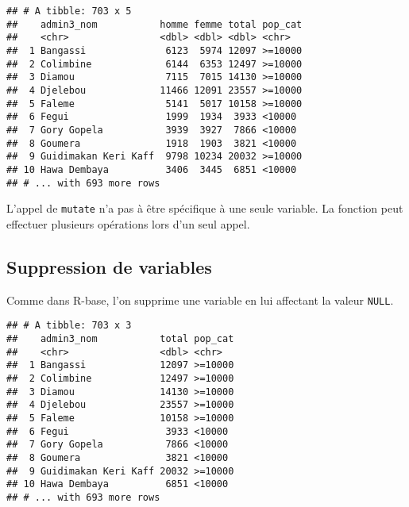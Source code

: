 \documentclass[]{book}
\newenvironment{Shaded}{\begin{snugshade}}{\end{snugshade}}
\newcommand{\KeywordTok}[1]{\textcolor[rgb]{0.13,0.29,0.53}{\textbf{#1}}}
\newcommand{\DataTypeTok}[1]{\textcolor[rgb]{0.13,0.29,0.53}{#1}}
\newcommand{\DecValTok}[1]{\textcolor[rgb]{0.00,0.00,0.81}{#1}}
\newcommand{\StringTok}[1]{\textcolor[rgb]{0.31,0.60,0.02}{#1}}
\newcommand{\CommentTok}[1]{\textcolor[rgb]{0.56,0.35,0.01}{\textit{#1}}}
\newcommand{\OtherTok}[1]{\textcolor[rgb]{0.56,0.35,0.01}{#1}}
\newcommand{\OperatorTok}[1]{\textcolor[rgb]{0.81,0.36,0.00}{\textbf{#1}}}
\newcommand{\NormalTok}[1]{#1}
\begin{document}
\begin{verbatim}
## # A tibble: 703 x 5
##    admin3_nom           homme femme total pop_cat
##    <chr>                <dbl> <dbl> <dbl> <chr>  
##  1 Bangassi              6123  5974 12097 >=10000
##  2 Colimbine             6144  6353 12497 >=10000
##  3 Diamou                7115  7015 14130 >=10000
##  4 Djelebou             11466 12091 23557 >=10000
##  5 Faleme                5141  5017 10158 >=10000
##  6 Fegui                 1999  1934  3933 <10000 
##  7 Gory Gopela           3939  3927  7866 <10000 
##  8 Goumera               1918  1903  3821 <10000 
##  9 Guidimakan Keri Kaff  9798 10234 20032 >=10000
## 10 Hawa Dembaya          3406  3445  6851 <10000 
## # ... with 693 more rows
\end{verbatim}

L'appel de \texttt{mutate} n'a pas à être spécifique à une seule
variable. La fonction peut effectuer plusieurs opérations lors d'un seul
appel.

\subsection{Suppression de variables}\label{suppression-de-variables-1}

Comme dans R-base, l'on supprime une variable en lui affectant la valeur
\texttt{NULL}.

\begin{Shaded}
\end{Shaded}

\begin{verbatim}
## # A tibble: 703 x 3
##    admin3_nom           total pop_cat
##    <chr>                <dbl> <chr>  
##  1 Bangassi             12097 >=10000
##  2 Colimbine            12497 >=10000
##  3 Diamou               14130 >=10000
##  4 Djelebou             23557 >=10000
##  5 Faleme               10158 >=10000
##  6 Fegui                 3933 <10000 
##  7 Gory Gopela           7866 <10000 
##  8 Goumera               3821 <10000 
##  9 Guidimakan Keri Kaff 20032 >=10000
## 10 Hawa Dembaya          6851 <10000 
## # ... with 693 more rows
\end{verbatim}
\end{document}
